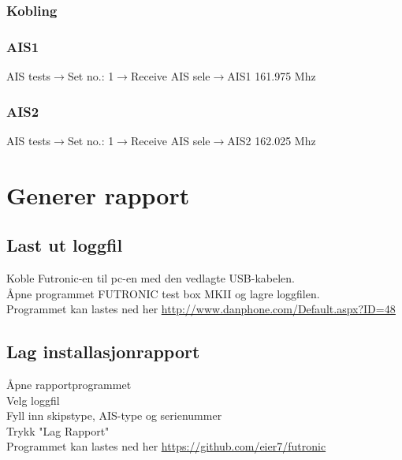 \documentclass{article}
\begin{document}
\subsubsection{Kobling}
\subsubsection{AIS1}
AIS tests$\rightarrow$Set no.: 1$\rightarrow$Receive AIS sele$\rightarrow$AIS1 161.975 Mhz 
\subsubsection{AIS2}
AIS tests$\rightarrow$Set no.: 1$\rightarrow$Receive AIS sele$\rightarrow$AIS2 162.025 Mhz
\section{Generer rapport}
\subsection{Last ut loggfil}
Koble Futronic-en til pc-en med den vedlagte USB-kabelen. \\
\AA{}pne programmet FUTRONIC test box MKII og lagre loggfilen. \\
Programmet kan lastes ned her \href{http://www.danphone.com/Default.aspx?ID=48}{\underline{http://www.danphone.com/Default.aspx?ID=48}} 
\subsection{Lag installasjonrapport}
\AA{}pne rapportprogrammet \\
Velg loggfil\\
Fyll inn skipstype, AIS-type og serienummer \\
Trykk "Lag Rapport" \\
Programmet kan lastes ned her \href{https://github.com/eier7/futronic}{\underline{https://github.com/eier7/futronic}} 
\end{document}
